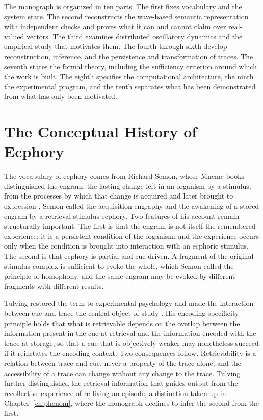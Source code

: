 The monograph is organized in ten parts. The first fixes vocabulary and the system state. The second reconstructs the wave-based semantic representation with independent checks and proves what it can and cannot claim over real-valued vectors. The third examines distributed oscillatory dynamics and the empirical study that motivates them. The fourth through sixth develop reconstruction, inference, and the persistence and transformation of traces. The seventh states the formal theory, including the sufficiency criterion around which the work is built. The eighth specifies the computational architecture, the ninth the experimental program, and the tenth separates what has been demonstrated from what has only been motivated.

\chapter{The Conceptual History of Ecphory}\label{ch:history}

The vocabulary of ecphory comes from Richard Semon, whose Mneme books distinguished the engram, the lasting change left in an organism by a stimulus, from the processes by which that change is acquired and later brought to expression \cite{semon1904,semon1909}. Semon called the acquisition engraphy and the awakening of a stored engram by a retrieval stimulus ecphory. Two features of his account remain structurally important. The first is that the engram is not itself the remembered experience: it is a persistent condition of the organism, and the experience occurs only when the condition is brought into interaction with an ecphoric stimulus. The second is that ecphory is partial and cue-driven. A fragment of the original stimulus complex is sufficient to evoke the whole, which Semon called the principle of homophony, and the same engram may be evoked by different fragments with different results.

Tulving restored the term to experimental psychology and made the interaction between cue and trace the central object of study \cite{tulving1973,tulving1983}. His encoding specificity principle holds that what is retrievable depends on the overlap between the information present in the cue at retrieval and the information encoded with the trace at storage, so that a cue that is objectively weaker may nonetheless succeed if it reinstates the encoding context. Two consequences follow. Retrievability is a relation between trace and cue, never a property of the trace alone, and the accessibility of a trace can change without any change to the trace. Tulving further distinguished the retrieval information that guides output from the recollective experience of re-living an episode, a distinction taken up in Chapter~\ref{ch:phenom}, where the monograph declines to infer the second from the first.

